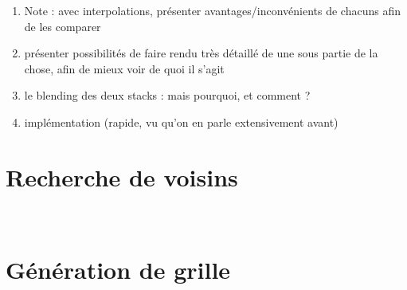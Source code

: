{{\begin{enumerate}
\begin{enumerate}
\begin{itemize}
					\item l'interpolation nearest neighbor : tout bête
					\item l'interpolation trilinéaire : c'est un petit peu mieux, permet d'estimer un blending des valeurs aux points pour mieux estimer la donnée
					\item l'interpolation barycentrique : meme effet que 3-lin., et en + : résiste au changement d'espace car espace défini par position des points du tétraèdre
				\end{itemize}
				\item Note : avec interpolations, présenter avantages/inconvénients de chacuns afin de les comparer
				\item présenter possibilités de faire rendu très détaillé de une sous partie de la chose, afin de mieux voir de quoi il s'agit
				\item le blending des deux stacks : mais pourquoi, et comment ?
				\item implémentation (rapide, vu qu'on en parle extensivement avant)
			\end{enumerate}
		\end{enumerate}
	}

	\section{Recherche de voisins}
	{
		\commentaire{}\\
	}

	\section{Génération de grille}
	{
		\commentaire{}\\
	}
}

